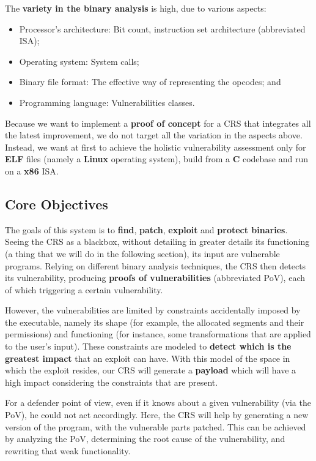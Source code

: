 \documentclass[12pt,a4paper,english,onecolumn]{IEEEtran}
\begin{document}
The \textbf{variety in the binary analysis} is high, due to various aspects:
\begin{itemize}
    \item Processor's architecture: Bit count, instruction set architecture (abbreviated ISA);
    \item Operating system: System calls;
    \item Binary file format: The effective way of representing the opcodes; and
    \item Programming language: Vulnerabilities classes. 
\end{itemize}

Because we want to implement a \textbf{proof of concept} for a CRS that integrates all the latest improvement, we do not target all the variation in the aspects above. Instead, we want at first to achieve the holistic vulnerability assessment only for \textbf{ELF} files (namely a \textbf{Linux} operating system), build from a \textbf{C} codebase and run on a \textbf{x86} ISA.

\subsection{Core Objectives}

The goals of this system is to \textbf{find}, \textbf{patch}, \textbf{exploit} and \textbf{protect binaries}. Seeing the CRS as a blackbox, without detailing in greater details its functioning (a thing that we will do in the following section), its input are vulnerable programs. Relying on different binary analysis techniques, the CRS then detects its vulnerability, producing \textbf{proofs of vulnerabilities} (abbreviated PoV), each of which triggering a certain vulnerability.

However, the vulnerabilities are limited by constraints accidentally imposed by the executable, namely its shape (for example, the allocated segments and their permissions) and functioning (for instance, some transformations that are applied to the user's input). These constraints are modeled to \textbf{detect which is the greatest impact} that an exploit can have. With this model of the space in which the exploit resides, our CRS will generate a \textbf{payload} which will have a high impact considering the constraints that are present.

For a defender point of view, even if it knows about a given vulnerability (via the PoV), he could not act accordingly. Here, the CRS will help by generating a new version of the program, with the vulnerable parts patched. This can be achieved by analyzing the PoV, determining the root cause of the vulnerability, and rewriting that weak functionality.
\end{document}
